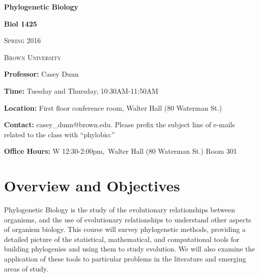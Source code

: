 \documentclass[12pt]{article}
\begin{document}
\thispagestyle{plain} %








\begin{center}
\bigskip




\textbf{Phylogenetic Biology}

\large{\bf{Biol 1425}}

\textsc{Spring 2016}

\textsc{Brown University} \bigskip

\end{center}

\noindent\textbf{Professor: }Casey Dunn\medskip

\noindent\textbf{Time:} Tuesday and Thursday, 10:30AM-11:50AM\medskip

\noindent\textbf{Location:} First floor conference room, Walter Hall (80 Waterman St.)\medskip

\noindent\textbf{Contact:} casey\_dunn@brown.edu. Please prefix the subject line of e-mails related to the class with ``phylobio:''\medskip

\noindent\textbf{Office Hours:} W 12:30-2:00pm,\ Walter Hall (80 Waterman St.) Room 301\medskip

\bigskip



\section*{Overview and Objectives}%
Phylogenetic Biology is the study of the evolutionary relationships between organisms, and the use of evolutionary relationships to understand other aspects of organism biology. This course will survey phylogenetic methods, providing a detailed picture of the statistical, mathematical, and computational tools for building phylogenies and using them to study evolution. We will also examine the application of these tools to particular problems in the literature and emerging areas of study. 
\end{document}
